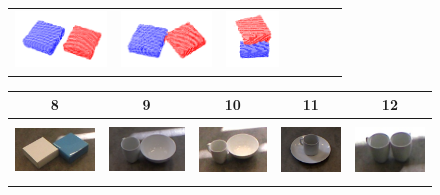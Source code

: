 \begin{figure}[h!]
\begin{tabular}{ccccccc}
    \includegraphics[height=1.5cm]{pictures/53.png}&
    \includegraphics[height=1.5cm]{pictures/63.png}&
    \includegraphics[height=1.5cm]{pictures/73.png}\\
    \end{tabular}
    \begin{tabular}{ccccc}
      \hline
      8 & 9 & 10 & 11 & 12 \\
      \hline
      \hline
    \includegraphics[height=1.5cm]{pictures/81.jpg}&
    \includegraphics[height=1.5cm]{pictures/91.jpg}& 
    \includegraphics[height=1.5cm]{pictures/101.jpg}&
    \includegraphics[height=1.5cm]{pictures/111.jpg}&
    \includegraphics[height=1.5cm]{pictures/121.jpg}\\

\end{tabular}
\end{figure}
